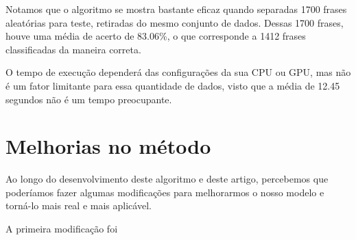 \documentclass[
article,			%
12pt,				%
a4paper,			%
english,			%
brazil,				%
sumario=tradicional,
twoside
]{abntex2}
\begin{document}
		Notamos que o algoritmo se mostra bastante eficaz quando separadas 1700 frases aleatórias para teste, retiradas do mesmo conjunto de dados. Dessas 1700 frases, houve uma média de acerto de 83.06\%, o que corresponde a 1412 frases classificadas da maneira correta.
		
		O tempo de execução dependerá das configurações da sua CPU ou GPU, mas não é um fator limitante para essa quantidade de dados, visto que a média de 12.45 segundos não é um tempo preocupante.
		
		
	\section{Melhorias no método}
	\label{melhorias}
	Ao longo do desenvolvimento deste algoritmo e deste artigo, percebemos que poderíamos fazer algumas modificações para melhorarmos o nosso modelo e torná-lo mais real e mais aplicável.
	
	A primeira modificação foi  
	
	
	\newpage
	\nocite{sitenaive}
	
	
	
\end{document}
